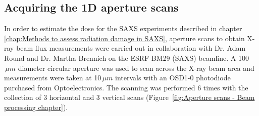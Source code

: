 \subsection{Acquiring the 1D aperture scans}
\label{sub:Acquiring the 1D aperture scans}
In order to estimate the dose for the SAXS experiments described in chapter \ref{chap:Methods to assess radiation damage in SAXS}, aperture scans to obtain X-ray beam flux measurements were carried out in collaboration with Dr. Adam Round and Dr. Martha Brennich on the ESRF BM29 (SAXS) beamline.
A 100$\,\mu m$ diameter circular aperture was used to scan across the X-ray beam area and measurements were taken at 10$\,\mu m$ intervals with an OSD1-0 photodiode purchased from Optoelectronics.
The scanning was performed 6 times with the collection of 3 horizontal and 3 vertical scans (Figure~\ref{fig:Aperture scans - Beam processing chapter}).
